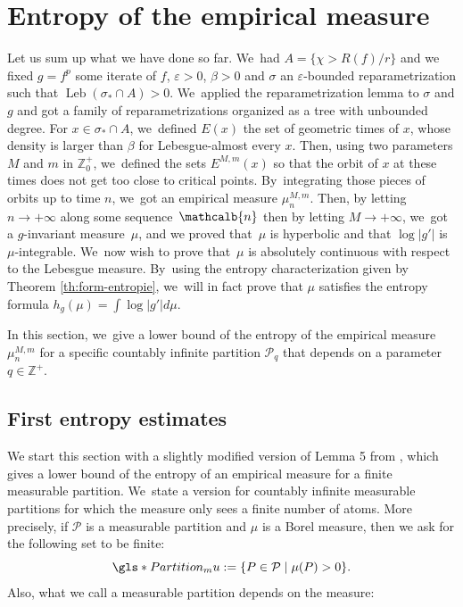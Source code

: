 \documentclass[JEP,XML,SOM,Unicode,NoFloatCountersInSection,published]{cedram}
\DeclareMathOperator{\Leb}{Leb}
\newcommand{\mcbn}{{\mathcalb{n}}}
\theoremstyle{definition}
\newcommand{\bbZ}{{\mathbb{Z}}}
\begin{document}
\section{Entropy of the empirical measure}
\label{sec:entropie}

Let us sum up what we have done so far. We~had $A = \{ \chi > R(f) / r \}$ and we fixed $g = f^p$ some iterate of $f$, $\varepsilon > 0$, $\beta > 0$ and $\sigma$ an $\varepsilon$-bounded reparametrization such that $\Leb(\sigma_* \cap A) > 0$. We~applied the reparametrization lemma to $\sigma$ and $g$ and got a family of reparametrizations organized as a tree with unbounded degree.
For $x \in \sigma_* \cap A$, we~defined $E(x)$ the set of geometric times of $x$, whose density is larger than $\beta$ for Lebesgue-almost every $x$.
Then, using two parameters $M$ and $m$ in $\bbZ_0^+$, we~defined the sets $E^{M,m}(x)$ so that the orbit of $x$ at these times does not get too close to critical points. By~integrating those pieces of orbits up to time $n$, we~got an empirical measure $\mu_n^{M,m}$.
Then, by letting $n \to +\infty$ along some sequence~$\mcbn$ then by letting $M \to +\infty$, we~got a $g$-invariant measure~$\mu$, and we proved that~$\mu$ is hyperbolic and that $\log |g'|$ is $\mu$-integrable. We~now wish to prove that~$\mu$ is absolutely continuous with respect to the Lebesgue measure. By~using the entropy characterization given by Theorem \ref{th:form-entropie}, we~will in fact prove that $\mu$ satisfies the entropy formula $h_g(\mu) = \int \log |g'| d \mu$.

In this section, we~give a lower bound of the entropy of the empirical measure $\mu_n^{M,m}$ for a specific countably infinite partition $\mathcal{P}_q$ that depends on a parameter $q \in \bbZ^+$.

\subsection{First entropy estimates}
\label{ssec:entropie1}

We start this section with a slightly modified version of Lemma 5 from \cite{MR4701884}, which gives a lower bound of the entropy of an empirical measure for a finite measurable partition. We~state a version for countably infinite measurable partitions for which the measure only sees a finite number of atoms. More precisely, if $\mathcal{P}$ is a measurable partition and $\mu$ is a Borel measure, then we ask for the following set to be finite:
\[
\gls*{Partition_mu} := \{ P \in \mathcal{P} \mid \mu(P) > 0 \}.
\]
Also, what we call a measurable partition depends on the measure:
\end{document}
